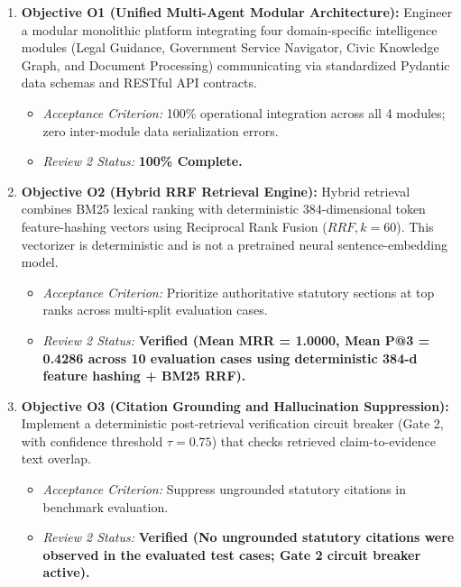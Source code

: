 \begin{enumerate}
    \item \textbf{Objective O1 (Unified Multi-Agent Modular Architecture):} Engineer a modular monolithic platform integrating four domain-specific intelligence modules (Legal Guidance, Government Service Navigator, Civic Knowledge Graph, and Document Processing) communicating via standardized Pydantic data schemas and RESTful API contracts.
    \begin{itemize}
        \item \textit{Acceptance Criterion:} 100\% operational integration across all 4 modules; zero inter-module data serialization errors.
        \item \textit{Review 2 Status:} \textbf{100\% Complete.}
    \end{itemize}

    \item \textbf{Objective O2 (Hybrid RRF Retrieval Engine):} Hybrid retrieval combines BM25 lexical ranking with deterministic 384-dimensional token feature-hashing vectors using Reciprocal Rank Fusion ($RRF, k=60$). This vectorizer is deterministic and is not a pretrained neural sentence-embedding model.
    \begin{itemize}
        \item \textit{Acceptance Criterion:} Prioritize authoritative statutory sections at top ranks across multi-split evaluation cases.
        \item \textit{Review 2 Status:} \textbf{Verified (Mean MRR = 1.0000, Mean P@3 = 0.4286 across 10 evaluation cases using deterministic 384-d feature hashing + BM25 RRF).}
    \end{itemize}

    \item \textbf{Objective O3 (Citation Grounding and Hallucination Suppression):} Implement a deterministic post-retrieval verification circuit breaker (Gate 2, with confidence threshold $\tau = 0.75$) that checks retrieved claim-to-evidence text overlap.
    \begin{itemize}
        \item \textit{Acceptance Criterion:} Suppress ungrounded statutory citations in benchmark evaluation.
        \item \textit{Review 2 Status:} \textbf{Verified (No ungrounded statutory citations were observed in the evaluated test cases; Gate 2 circuit breaker active).}
    \end{itemize}


\end{enumerate}
